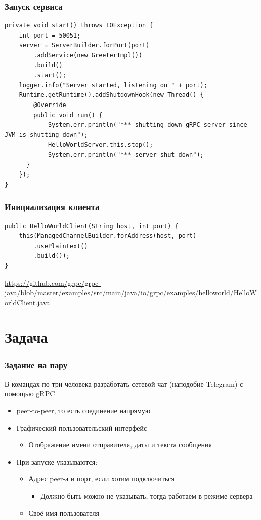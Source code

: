 \documentclass[xetex,mathserif,serif]{beamer}
\begin{document}
	\begin{frame}[fragile]
		\frametitle{Запуск сервиса}
		\begin{footnotesize}
			\begin{verbatim}
private void start() throws IOException {
    int port = 50051;
    server = ServerBuilder.forPort(port)
        .addService(new GreeterImpl())
        .build()
        .start();
    logger.info("Server started, listening on " + port);
    Runtime.getRuntime().addShutdownHook(new Thread() {
        @Override
        public void run() {
            System.err.println("*** shutting down gRPC server since JVM is shutting down");
            HelloWorldServer.this.stop();
            System.err.println("*** server shut down");
      }
    });
}
			\end{verbatim}
		\end{footnotesize}
	\end{frame}

	\begin{frame}[fragile]
		\frametitle{Инициализация клиента}
		\begin{verbatim}
public HelloWorldClient(String host, int port) {
    this(ManagedChannelBuilder.forAddress(host, port)
        .usePlaintext()
        .build());
}
		\end{verbatim}
		\vspace{5mm}
		\url{https://github.com/grpc/grpc-java/blob/master/examples/src/main/java/io/grpc/examples/helloworld/HelloWorldClient.java}
	\end{frame}

	\section{Задача}

	\begin{frame}
		\frametitle{Задание на пару}
		В командах по три человека разработать сетевой чат (наподобие Telegram) с помощью gRPC
		\begin{itemize}
			\item peer-to-peer, то есть соединение напрямую
			\item Графический пользовательский интерфейс
			\begin{itemize}
				\item Отображение имени отправителя, даты и текста сообщения
			\end{itemize}
			\item При запуске указываются:
			\begin{itemize}
				\item Адрес peer-а и порт, если хотим подключиться
				\begin{itemize}
					\item Должно быть можно не указывать, тогда работаем в режиме сервера
				\end{itemize}
				\item Своё имя пользователя
			\end{itemize}
		\end{itemize}
	\end{frame}
\end{document}
